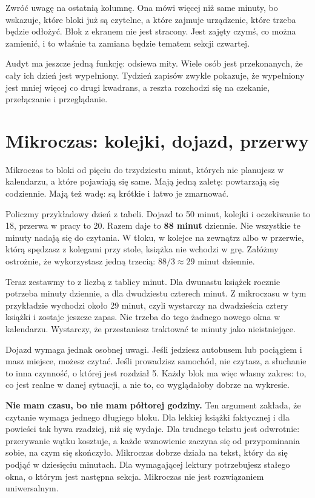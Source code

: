 Zwróć uwagę na ostatnią kolumnę. Ona mówi więcej niż same minuty, bo wskazuje, które bloki
już są czytelne, a które zajmuje urządzenie, które trzeba będzie odłożyć. Blok z ekranem
nie jest stracony. Jest zajęty czymś, co można zamienić, i to właśnie ta zamiana
będzie tematem sekcji czwartej.

Audyt ma jeszcze jedną funkcję: odsiewa mity. Wiele osób jest przekonanych, że cały ich dzień
jest wypełniony. Tydzień zapisów zwykle pokazuje, że wypełniony jest mniej więcej co drugi
kwadrans, a reszta rozchodzi się na czekanie, przełączanie i przeglądanie.

\section{Mikroczas: kolejki, dojazd, przerwy}

Mikroczas to bloki od pięciu do trzydziestu minut, których nie planujesz w kalendarzu, a które
pojawiają się same. Mają jedną zaletę: powtarzają się codziennie. Mają też wadę: są krótkie
i łatwo je zmarnować.

Policzmy przykładowy dzień z tabeli. Dojazd to 50 minut, kolejki i oczekiwanie to 18, przerwa
w pracy to 20. Razem daje to \textbf{88 minut} dziennie. Nie wszystkie te minuty nadają się do
czytania. W tłoku, w kolejce na zewnątrz albo w przerwie, którą spędzasz z kolegami przy stole,
książka nie wchodzi w grę. Załóżmy ostrożnie, że wykorzystasz jedną trzecią: $88 / 3 \approx 29$
minut dziennie.

Teraz zestawmy to z liczbą z tablicy minut. Dla dwunastu książek rocznie potrzeba
 minuty dziennie, a dla dwudziestu czterech  minut. Z mikroczasu
w tym przykładzie wychodzi około 29 minut, czyli wystarczy na dwadzieścia cztery książki
i zostaje jeszcze zapas. Nie trzeba do tego żadnego nowego okna w kalendarzu. Wystarczy,
że przestaniesz traktować te minuty jako nieistniejące.

Dojazd wymaga jednak osobnej uwagi. Jeśli jedziesz autobusem lub pociągiem i masz miejsce,
możesz czytać. Jeśli prowadzisz samochód, nie czytasz, a słuchanie to inna czynność, o której
jest rozdział 5. Każdy blok ma więc własny zakres: to, co jest realne w danej sytuacji,
a nie to, co wyglądałoby dobrze na wykresie.

\begin{falle}
\textbf{\glqq Nie mam czasu, bo nie mam półtorej godziny\grqq{}.} Ten argument zakłada, że
czytanie wymaga jednego długiego bloku. Dla lekkiej książki faktycznej i dla powieści tak bywa
rzadziej, niż się wydaje. Dla trudnego tekstu jest odwrotnie: przerywanie wątku kosztuje, a każde
wznowienie zaczyna się od przypominania sobie, na czym się skończyło. Mikroczas dobrze działa
na tekst, który da się podjąć w dziesięciu minutach. Dla wymagającej lektury potrzebujesz
stałego okna, o którym jest następna sekcja. Mikroczas nie jest rozwiązaniem uniwersalnym.
\end{falle}

